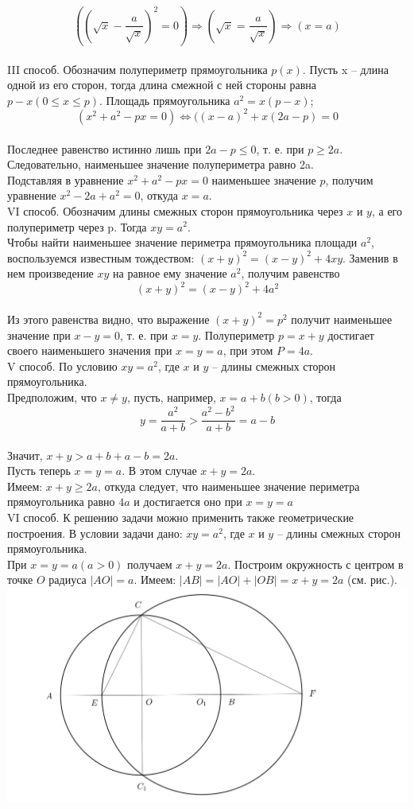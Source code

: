 \documentclass{article}
\begin{document}
$$((\sqrt{x}-\frac{a}{\sqrt{x}})^2=0)\Rightarrow(\sqrt{x}=\frac{a}{\sqrt{x}})\Rightarrow(x=a)$$
\\III способ. Обозначим полупериметр прямоугольника $p(x)$. Пусть x -- длина одной из его сторон, тогда длина смежной с ней стороны равна $p-x(0\leqslant x\leqslant p)$. Площадь прямоугольника $a^2=x(p-x)$;
$$(x^2+a^2-px=0)\Leftrightarrow((x-a)^2+x(2a-p)=0$$
\\Последнее равенство истинно лишь при $2a-p\leqslant0$, т. е. при $p\geqslant2a$. Следовательно, наименьшее значение полупериметра равно 2a.
\\Подставляя в уравнение $x^2+a^2-px=0$ наименьшее значение $p$, получим уравнение $x^2-2a+a^2=0$, откуда $x=a$.
\\VI способ. Обозначим длины смежных сторон прямоугольника через $x$ и $y$, а его полупериметр через p. Тогда $xy=a^2$.
\\Чтобы найти наименьшее значение периметра прямоугольника площади $a^2$, воспользуемся известным тождеством: $(x+y)^2=(x-y)^2+4xy$. Заменив в нем произведение $xy$ на равное ему значение $a^2$, получим равенство
$$(x+y)^2=(x-y)^2+4a^2$$
\\Из этого равенства видно, что выражение $(x+y)^2=p^2$ получит наименьшее значение при $x-y=0$, т. е. при $x=y$. Полупериметр $p=x+y$ достигает своего наименьшего значения при $x=y=a$, при этом $P=4a$. 
\\V способ. По условию $xy=a^2$, где $x$ и $y$ -- длины смежных сторон прямоугольника.
\\Предположим, что $x\neq y$, пусть, например, $x=a+b(b>0)$, тогда 
$$y=\frac{a^2}{a+b}>\frac{a^2-b^2}{a+b}=a-b$$
\\Значит, $x+y>a+b+a-b=2a$.
\\Пусть теперь $x=y=a$. В этом случае $x+y=2a$.
\\Имеем: $x+y\geqslant2a$, откуда следует, что наименьшее значение периметра прямоугольника равно $4a$ и достигается оно при $x=y=a$
\\VI способ. К решению задачи можно применить также геометрические построения. В условии задачи дано: $xy=a^2$, где $x$ и $y$ -- длины смежных сторон прямоугольника.
\\При $x=y=a(a>0)$ получаем $x+y=2a$. Построим окружность с центром в точке $O$ радиуса $|AO|=a$. Имеем: $|AB|=|AO|+|OB|=x+y=2a$ (см. рис.).
\\
\includegraphics[scale=0.25]{circle.png}
\end{document}
